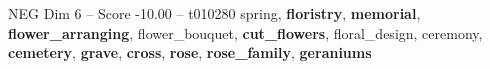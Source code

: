 \begin{textsample}{NEG Dim 6 – Score -10.00 – t010280}  \label{ex:f6_neg_016}
spring, \textbf{floristry}, \textbf{memorial}, \textbf{flower\_arranging}, flower\_bouquet, \textbf{cut\_flowers}, floral\_design, ceremony, \textbf{cemetery}, \textbf{grave}, \textbf{cross}, \textbf{rose}, \textbf{rose\_family}, \textbf{geraniums}

\end{textsample}
